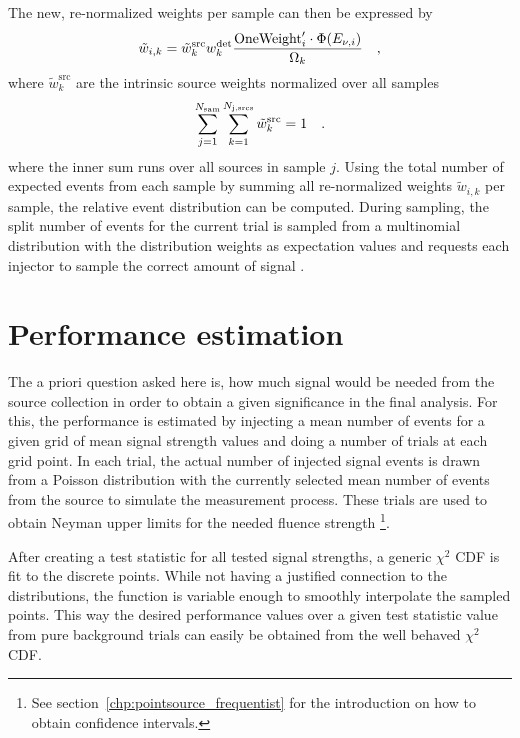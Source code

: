 The new, re-normalized weights per sample can then be expressed by
\begin{equation}
    \tilde{w}_{i,k}
    = \tilde{w}_k^\text{src} w_k^\text{det}
      \frac{\text{OneWeight}'_i \cdot \Phi(E_{\nu,i})}{\Omega_k}
  \quad\text{,}
\end{equation}
where $\tilde{w}_k^\text{src}$ are the intrinsic source weights normalized over all samples
\begin{equation}
  \sum_{j=1}^{N_\text{sam}} \sum_{k=1}^{N_\text{j,srcs}}
  \tilde{w}_k^\text{src} = 1
  \quad\text{.}
\end{equation}
where the inner sum runs over all sources in sample $j$.
Using the total number of expected events from each sample by summing all re-normalized weights $\tilde{w}_{i,k}$ per sample, the relative event distribution can be computed.
During sampling, the split number of events for the current trial is sampled from a multinomial distribution with the distribution weights as expectation values and requests each injector to sample the correct amount of signal .


\section{Performance estimation}
The a priori question asked here is, how much signal would be needed from the source collection in order to obtain a given significance in the final analysis.
For this, the performance is estimated by injecting a mean number of events for a given grid of mean signal strength values and doing a number of trials at each grid point.
In each trial, the actual number of injected signal events is drawn from a Poisson distribution with the currently selected mean number of events from the source to simulate the measurement process.
These trials are used to obtain Neyman upper limits for the needed fluence strength \footnote{See section~\ref{chp:pointsource_frequentist} for the introduction on how to obtain confidence intervals.}.

After creating a test statistic for all tested signal strengths, a generic $\chi^2$ CDF is fit to the discrete points.
While not having a justified connection to the distributions, the function is variable enough to smoothly interpolate the sampled points.
This way the desired performance values over a given test statistic value from pure background trials can easily be obtained from the well behaved $\chi^2$ CDF.

